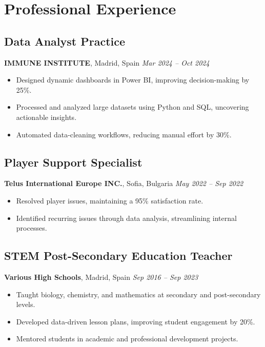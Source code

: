 \documentclass[11pt,a4paper]{article}
\begin{document}
\vspace{1em}

\section*{Professional Experience}

\subsection*{Data Analyst Practice}
\textbf{IMMUNE INSTITUTE}, Madrid, Spain \hfill \textit{Mar 2024 – Oct 2024}  
\begin{itemize}[leftmargin=0.5cm]
    \item Designed dynamic dashboards in Power BI, improving decision-making by 25\%.
    \item Processed and analyzed large datasets using Python and SQL, uncovering actionable insights.
    \item Automated data-cleaning workflows, reducing manual effort by 30\%.
\end{itemize}

\subsection*{Player Support Specialist}
\textbf{Telus International Europe INC.}, Sofia, Bulgaria \hfill \textit{May 2022 – Sep 2022}  
\begin{itemize}[leftmargin=0.5cm]
    \item Resolved player issues, maintaining a 95\% satisfaction rate.
    \item Identified recurring issues through data analysis, streamlining internal processes.
\end{itemize}

\subsection*{STEM Post-Secondary Education Teacher}
\textbf{Various High Schools}, Madrid, Spain \hfill \textit{Sep 2016 – Sep 2023}  
\begin{itemize}[leftmargin=0.5cm]
    \item Taught biology, chemistry, and mathematics at secondary and post-secondary levels.
    \item Developed data-driven lesson plans, improving student engagement by 20\%.
    \item Mentored students in academic and professional development projects.
\end{itemize}
\end{document}
